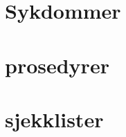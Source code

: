 \documentclass[a4paper,12pt,twoside]{memoir}
\begin{document}
\sffamily

			\renewcommand{\partname}{Del}
			\renewcommand{\chaptername}{Kapittel}
            \renewcommand{\contentsname}{Innhold}
            \renewcommand\listfigurename{Illustrasjoner}
            \renewcommand\tablename{Tabell}
			\renewcommand\listtablename{Tabeller}
            \renewcommand{\figurename}{Illustrasjon}
			\renewcommand{\bibname}{Kilder:}

\frontmatter
	
	
\mainmatter
	\part{Sykdommer}	
		  {}
		  

	\part{prosedyrer}
	\part{sjekklister}	
\backmatter

 
          

	\listoffigures
\end{document}
